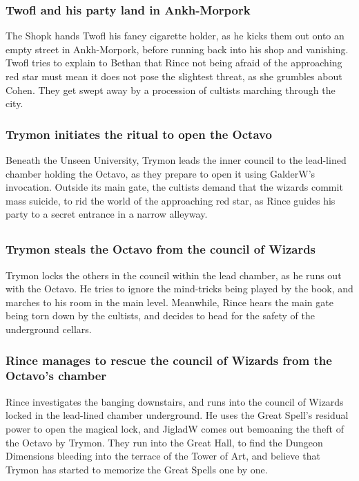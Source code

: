 \subsubsection{\Gls{Twofl} and his party land in Ankh-Morpork}
The \Gls{Shopk} hands \Gls{Twofl} his fancy cigarette holder, as he kicks them out onto an empty
street in Ankh-Morpork, before running back into his shop and vanishing. \Gls{Twofl} tries to
explain to \Gls{Bethan} that \Gls{Rince} not being afraid of the approaching red star must mean it
does not pose the slightest threat, as she grumbles about \Gls{Cohen}. They get swept away by a
procession of cultists marching through the city.

\subsubsection{\Gls{Trymon} initiates the ritual to open the Octavo}
Beneath the Unseen University, \Gls{Trymon} leads the inner council to the lead-lined chamber
holding the Octavo, as they prepare to open it using \Gls{GalderW}'s invocation. Outside its main
gate, the cultists demand that the wizards commit mass suicide, to rid the world of the approaching
red star, as \Gls{Rince} guides his party to a secret entrance in a narrow alleyway.

\subsection{}
\subsubsection{\Gls{Trymon} steals the Octavo from the council of Wizards}
\Gls{Trymon} locks the others in the council within the lead chamber, as he runs out with the
Octavo. He tries to ignore the mind-tricks being played by the book, and marches to his room in the
main level. Meanwhile, \Gls{Rince} hears the main gate being torn down by the cultists, and decides
to head for the safety of the underground cellars.

\subsubsection{\Gls{Rince} manages to rescue the council of Wizards from the Octavo's chamber}
\Gls{Rince} investigates the banging downstairs, and runs into the council of Wizards locked in
the lead-lined chamber underground. He uses the Great Spell's residual power to open the magical
lock, and \Gls{JigladW} comes out bemoaning the theft of the Octavo by \Gls{Trymon}. They run into
the Great Hall, to find the Dungeon Dimensions bleeding into the terrace of the Tower of Art, and
believe that \Gls{Trymon} has started to memorize the Great Spells one by one.

